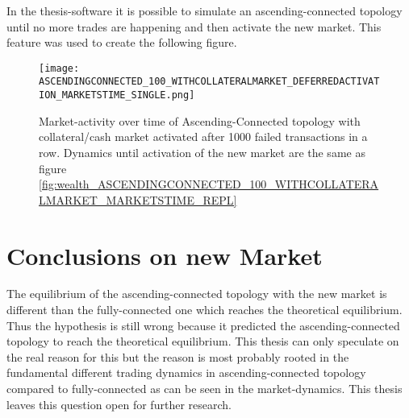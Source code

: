 \documentclass[Bachelorarbeit.tex]{subfiles}
\begin{document}
In the thesis-software it is possible to simulate an ascending-connected topology until no more trades are happening and then activate the new market. This feature was used to create the following figure.

\begin{figure}[H]
	\centering
  \texttt{[image: ASCENDINGCONNECTED\_100\_WITHCOLLATERALMARKET\_DEFERREDACTIVATION\_MARKETSTIME\_SINGLE.png]}
	\caption{Market-activity over time of Ascending-Connected topology with collateral/cash market activated after 1000 failed transactions in a row. Dynamics until activation of the new market are the same as figure \ref{fig:wealth_ASCENDINGCONNECTED_100_WITHCOLLATERALMARKET_MARKETSTIME_REPL}}
		\label{fig:wealth_ASCENDINGCONNECTED_100_WITHCOLLATERALMARKET_DEFERREDACTIVATION_MARKETSTIME_SINGLE}
\end{figure}

\section{Conclusions on new Market}
The equilibrium of the ascending-connected topology with the new market is different than the fully-connected one which reaches the theoretical equilibrium. Thus the hypothesis is still wrong because it predicted the ascending-connected topology to reach the theoretical equilibrium. This thesis can only speculate on the real reason for this but the reason is most probably rooted in the fundamental different trading dynamics in ascending-connected topology compared to fully-connected as can be seen in the market-dynamics. This thesis leaves this question open for further research.
\end{document}
